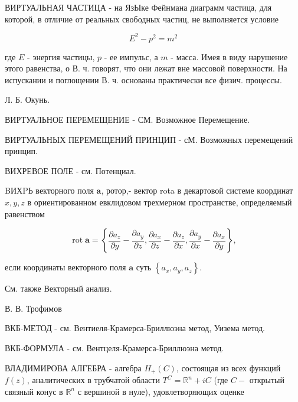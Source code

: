 \documentclass[10pt]{article}
\begin{document}
ВИРТУАЛЬНАЯ ЧАСТИЦА - на ЯзЫке Фейнмана диаграмм частица, для которой, в отличие от реальных свободных частиц, не выполняется условие



\[

E^{2}-p^{2}=m^{2}

\]



где $E$ - энергия частицы, $p$ - ее импульс, а $m$ - масса. Имея в виду нарушение этого равенства, о В. ч. говорят, что они лежат вне массовой поверхности. На испускании и поглощении В. ч. основаны практически все физич. процессы.



Л. Б. Окунь.



ВИРТУАЛЬНОЕ ПЕРЕМЕЩЕНИЕ - СМ. Возможное Перемещение.



ВИРТУАЛЬНЫХ ПЕРЕМЕЩЕНИЙ ПРИНЦИП - сМ. Возможных перемещений принцип.



ВИХРЕВОЕ ПОЛЕ - см. Потенциал.



BИХPЬ векторного поля $\boldsymbol{a}$, ротор,- вектор rota в декартовой системе координат $x, y, z$ в ориентированном евклидовом трехмерном пространстве, определяемый равенством



\[

\operatorname{rot} \boldsymbol{a}=\left\{\frac{\partial a_{z}}{\partial y}-\frac{\partial a_{y}}{\partial z}, \frac{\partial a_{x}}{\partial z}-\frac{\partial a_{z}}{\partial x}, \frac{\partial a_{y}}{\partial x}-\frac{\partial a_{x}}{\partial y}\right\},

\]



если координаты векторного поля $\boldsymbol{a}$ суть $\left\{a_{x}, a_{y}, a_{z}\right\}$.



См. также Векторный анализ.



В. В. Трофимов



ВКБ-МЕТОД - см. Вентиеля-Крамерса-Бриллюэна метод, Уизема метод.



ВКБ-ФОРМУЛА - см. Вентцеля-Крамерса-Бриллюэна метод.



ВЛАДИМИРОВА АЛГЕБРА - алгебра $H_{+}(C)$, состоящая из всех функций $f(z)$, аналитических в трубчатой области $T^{C}=\mathbb{R}^{n}+i C$ (где $C-$ открытый связный конус в $\mathbb{R}^{n}$ с вершиной в нуле), удовлетворяющих оценке
\end{document}
